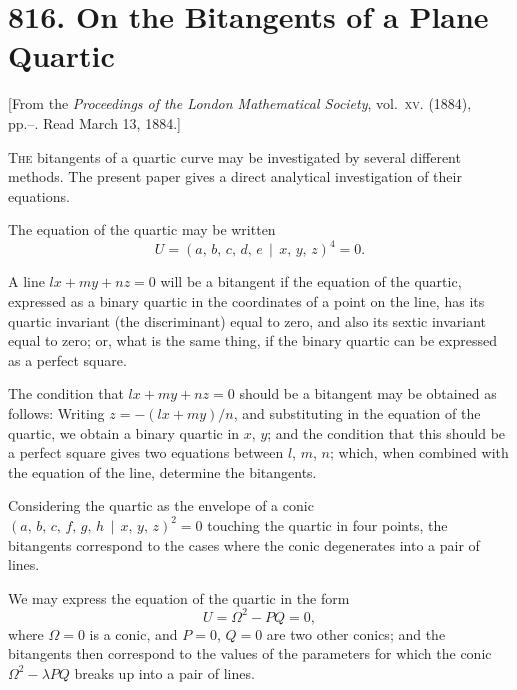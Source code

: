 \documentclass[11pt,a4paper]{book}
\begin{document}
\newpage
\section*{816. On the Bitangents of a Plane Quartic}

\begin{center}
\small[From the \textit{Proceedings of the London Mathematical Society}, vol.~\textsc{xv}. (1884),\\
pp.--. Read March 13, 1884.]
\end{center}

\bigskip

\noindent
\textsc{The} bitangents of a quartic curve may be investigated by several different methods. The present paper gives a direct analytical investigation of their equations.

The equation of the quartic may be written
\[
U = (a,\,b,\,c,\,d,\,e\,\mid\,x,\,y,\,z)^4 = 0.
\]

A line $lx + my + nz = 0$ will be a bitangent if the equation of the quartic, expressed as a binary quartic in the coordinates of a point on the line, has its quartic invariant (the discriminant) equal to zero, and also its sextic invariant equal to zero; or, what is the same thing, if the binary quartic can be expressed as a perfect square.

The condition that $lx + my + nz = 0$ should be a bitangent may be obtained as follows: Writing $z = -(lx + my)/n$, and substituting in the equation of the quartic, we obtain a binary quartic in $x$, $y$; and the condition that this should be a perfect square gives two equations between $l$, $m$, $n$; which, when combined with the equation of the line, determine the bitangents.

Considering the quartic as the envelope of a conic $(a,\,b,\,c,\,f,\,g,\,h\,\mid\,x,\,y,\,z)^2 = 0$ touching the quartic in four points, the bitangents correspond to the cases where the conic degenerates into a pair of lines.

We may express the equation of the quartic in the form
\[
U = \Omega^2 - PQ = 0,
\]
where $\Omega = 0$ is a conic, and $P = 0$, $Q = 0$ are two other conics; and the bitangents then correspond to the values of the parameters for which the conic $\Omega^2 - \lambda PQ$ breaks up into a pair of lines.
\end{document}
